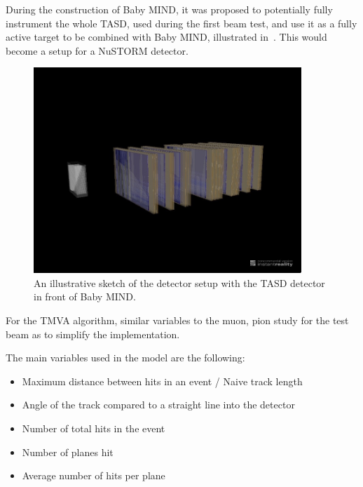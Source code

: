 During the construction of Baby MIND, it was proposed to potentially fully instrument the whole TASD, used during the first beam test, and use it as a fully active target to be combined with Baby MIND, illustrated in~. This would become a setup for a NuSTORM detector.

\begin{figure}[h!]
\centering
\includegraphics[width=0.9\textwidth]{figures/MINDAida.jpeg}
\caption{An illustrative sketch of the detector setup with the TASD detector in front of Baby MIND.}
\label{fig:TASDandMIND}
\end{figure}

For the TMVA algorithm, similar variables to the muon, pion study for the test beam as to simplify the implementation.

The main variables used in the model are the following:
\begin{itemize}
\item Maximum distance between hits in an event / Naive track length
\item Angle of the track compared to a straight line into the detector
\item Number of total hits in the event
\item Number of planes hit
\item Average number of hits per plane
\end{itemize}

